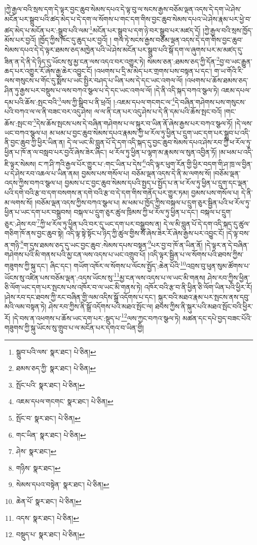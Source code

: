 །ཀྱེ་རྒྱལ་བའི་སྲས་དག་དེ་ལྟར་བྱང་ཆུབ་སེམས་དཔའ་དེ་ལྟ་བུ་ལ་སངས་རྒྱས་བཅོམ་ལྡན་འདས་དེ་དག་ཡེ་ཤེས་མངོན་པར་སྒྲུབ་པའི་ཚད་མེད་པ་དེ་དག་ལ་སོགས་པ་གང་དག་གིས་བྱང་ཆུབ་སེམས་དཔའ་ཡེ་ཤེས་རྣམ་པར་ཕྱེ་བ་ཚད་མེད་པ་མངོན་པར་:སྒྲུབ་པའི་ལམ་\footnote{སྒྲུབ་པའི་ལས་  སྣར་ཐང་།  པེ་ཅིན། }མངོན་པར་སྒྲུབ་པ་དག་ཉེ་བར་སྒྲུབ་པར་མཛད་དོ། །ཀྱེ་རྒྱལ་བའི་སྲས་ཁྱོད་མོས་པར་བྱའོ། །ཁྱོད་ཀྱིས་ཁོང་དུ་ཆུད་པར་བྱའོ། །
གལ་ཏེ་སངས་རྒྱས་བཅོམ་ལྡན་འདས་དེ་དག་གིས་བྱང་ཆུབ་སེམས་དཔའ་དེ་དེ་ལྟར་ཐམས་ཅད་མཁྱེན་པའི་ཡེ་ཤེས་མངོན་པར་སྒྲུབ་པའི་སྒོ་དག་ལ་ཞུགས་པར་མ་མཛད་དུ་ཟིན་ན་དེ་ནི་དེ་ཉིད་དུ་ཡོངས་སུ་མྱ་ངན་ལས་འདའ་བར་འགྱུར་ཏེ། སེམས་ཅན་:ཐམས་ཅད་ཀྱི་དོན་\footnote{ཐམས་ཅད་ཀྱི་  སྣར་ཐང་།  པེ་ཅིན། }བྱ་བ་ཡང་རྒྱུན་ཆད་པར་འགྱུར་རོ་ཞེས་རྒྱ་ཆེར་འབྱུང་ངོ། །འཕགས་པ་དྲི་མ་མེད་པར་གྲགས་པས་བསྟན་པ་དང་། ག་ཡ་གོའི་རི་ལས་གསུངས་པ་གོང་དུ་སྨོས་པ་ཡང་སྤྱིར་བཤད་པ་ཡིན་པས་དེ་དང་ཡང་འགལ་ལོ། །འཕགས་པ་ཆོས་ཐམས་ཅད་ཤིན་ཏུ་རྒྱས་པར་བསྡུས་པ་ལས་བཀའ་སྩལ་པ་དེ་དང་ཡང་འགལ་ལོ། །དེ་ནི་འདི་སྐད་བཀའ་སྩལ་ཏེ། འཇམ་དཔལ་དམ་པའི་ཆོས་:སྤང་བའི་\footnote{སྤོང་པའི་  སྣར་ཐང་།  པེ་ཅིན། }ལས་ཀྱི་སྒྲིབ་པ་ནི་ཕྲའོ། །:འཇམ་དཔལ་གངགང་ལ་\footnote{འཇམ་དཔལ་གངགང་  སྣར་ཐང་།  པེ་ཅིན། }དེ་བཞིན་གཤེགས་པས་གསུངས་པའི་བཀའ་ལ་ལ་ནི་བཟང་བར་འདུ་ཤེས། ལ་ལ་ནི་ངན་པར་འདུ་ཤེས་པ་དེ་ནི་དམ་པའི་ཆོས་སྤང་བའོ། །གང་ཆོས་:སྤང་བ་\footnote{སྤོང་བ་  སྣར་ཐང་།  པེ་ཅིན། }དེས་ཆོས་སྤངས་པས་དེ་བཞིན་གཤེགས་པ་ལ་སྐུར་བ་ཡིན་ནོ་ཞེས་རྒྱས་པར་བཀའ་སྩལ་ཏོ། །དེ་ལས་ཡང་བཀའ་སྩལ་པ། མ་ཕམ་པ་བྱང་ཆུབ་སེམས་དཔའ་རྣམས་ཀྱི་ཕ་རོལ་ཏུ་ཕྱིན་པ་དྲུག་ཡང་དག་པར་སྒྲུབ་པ་འདི་ནི་བྱང་ཆུབ་ཀྱི་ཕྱིར་ཡིན་ན། དེ་ལ་ཡང་མི་བླུན་པོ་དེ་དག་འདི་སྐད་དུ་བྱང་ཆུབ་སེམས་དཔའ་ཤེས་རབ་ཀྱི་ཕ་རོལ་ཏུ་ཕྱིན་པ་ཁོ་ན་ལ་བསླབ་པར་བྱའོ་ཞེས་ཟེར་ཞིང་། ཕ་རོལ་ཏུ་ཕྱིན་པ་ལྷག་མ་རྣམས་ལ་སུན་འབྱིན་ཏོ། །མ་ཕམ་པ་འདི་ཇི་ལྟར་སེམས། ང་ཀ་ཤི་ཀའི་རྒྱལ་པོར་གྱུར་པ་:གང་ཡིན་པ་དེས་\footnote{གང་ཡིན་  སྣར་ཐང་།  པེ་ཅིན། }འདི་ལྟར་ཕུག་རོན་གྱི་ཕྱིར་བདག་གི་ཤ་ཁྲ་ལ་བྱིན་པ་དེ་ཤེས་རབ་འཆལ་པ་ཡིན་ནམ། བྱམས་པས་གསོལ་པ། བཅོམ་ལྡན་འདས་དེ་ནི་མ་ལགས་སོ། །བཅོམ་ལྡན་འདས་ཀྱིས་བཀའ་སྩལ་པ། བྱམས་པ་ང་བྱང་ཆུབ་སེམས་དཔའི་སྤྱད་པ་སྤྱོད་པ་ན་ཕ་རོལ་ཏུ་ཕྱིན་པ་དྲུག་དང་ལྡན་པའི་དགེ་བའི་རྩ་བ་དག་བསགས་ན་དགེ་བའི་རྩ་བ་དེ་དག་གིས་གནོད་པར་གྱུར་ཏམ། བྱམས་པས་གསོལ་པ། དེ་ནི་མ་ལགས་སོ། །བཅོམ་ལྡན་འདས་ཀྱིས་བཀའ་སྩལ་པ། མ་ཕམ་པ་ཁྱོད་ཀྱིས་བསྐལ་པ་དྲུག་ཅུར་སྦྱིན་པའི་ཕ་རོལ་ཏུ་ཕྱིན་པ་ཡང་དག་པར་བསྒྲུབས། བསྐལ་པ་དྲུག་ཅུར་ཚུལ་ཁྲིམས་ཀྱི་ཕ་རོལ་ཏུ་ཕྱིན་པ་དང་། བསྐལ་པ་དྲུག་ཅུར་:ཤེས་རབ་\footnote{ཤེས་  སྣར་ཐང་། }ཀྱི་ཕ་རོལ་ཏུ་ཕྱིན་པའི་བར་དུ་ཡང་དག་པར་བསྒྲུབས་ན། དེ་ལ་མི་བླུན་པོ་དེ་དག་འདི་སྐད་དུ་ཚུལ་གཅིག་ཁོ་ནས་བྱང་ཆུབ་སྟེ། འདི་ལྟ་སྟེ་སྟོང་པ་ཉིད་ཀྱི་ཚུལ་གྱིས་སོ་ཞེས་ཟེར་རོ་ཞེས་རྒྱས་པར་འབྱུང་ངོ། །དེ་ལྟ་བས་ན་གཉི་\footnote{གཉིས་  སྣར་ཐང་། }ག་དུས་ཐམས་ཅད་དུ་ཡང་བྱང་ཆུབ་:སེམས་དཔས་བསྟན་\footnote{སེམས་དཔའ་བསྟེན་  སྣར་ཐང་།  པེ་ཅིན། }པར་བྱ་བ་ཁོ་ན་ཡིན་ནོ། །དེ་ལྟར་ན་དེ་བཞིན་གཤེགས་པའི་མི་གནས་པའི་མྱ་ངན་ལས་འདས་པ་ཡང་འགྲུབ་པོ། །འདི་ལྟར་སྦྱིན་པ་ལ་སོགས་པའི་ཐབས་ཀྱིས་གཟུགས་ཀྱི་སྐུ་དང་། ཞིང་དང་། གཡོག་འཁོར་ལ་སོགས་པ་ལོངས་སྤྱོད་:ཆེན་པོའི་\footnote{ཆེན་པོ་  སྣར་ཐང་།  པེ་ཅིན། }འབྲས་བུ་ཕུན་སུམ་ཚོགས་པ་ཡོངས་སུ་འཛིན་པས་བཅོམ་ལྡན་:འདས་ཡོངས་སུ་\footnote{འདས་  སྣར་ཐང་།  པེ་ཅིན། }མྱ་ངན་ལས་འདས་པ་ལ་ཡང་མི་གནས། ཤེས་རབ་ཀྱིས་ཕྱིན་ཅི་ལོག་ཡང་དག་པར་སྤངས་པས་འཁོར་བ་ལ་ཡང་མི་གནས་ཏེ། འཁོར་བའི་རྩ་བ་ནི་ཕྱིན་ཅི་ལོག་ཡིན་པའི་ཕྱིར་རོ། །ཤེས་རབ་དང་ཐབས་ཀྱི་རང་བཞིན་གྱི་ལམ་འདིས་སྒྲོ་འདོགས་པ་དང་། སྐུར་བའི་མཐའ་རྣམ་པར་སྤངས་ནས་དབུ་མའི་ལམ་བསྟན་ཏེ། ཤེས་རབ་ཀྱིས་ནི་སྒྲོ་འདོགས་པའི་མཐའ་སྤོང་ལ། ཐབས་ཀྱིས་ནི་སྐུར་པའི་མཐའ་སྤོང་བའི་ཕྱིར་རོ། །དེ་བས་ན་འཕགས་པ་ཆོས་ཡང་དག་པར་:སྡུད་པ་\footnote{བསྡུད་པ་  སྣར་ཐང་།  པེ་ཅིན། }ལས་ཀྱང་བཀའ་སྩལ་ཏེ། མཚན་དང་དཔེ་བྱད་བཟང་པོའི་གཟུགས་ཀྱི་སྐུ་ཡོངས་སུ་གྲུབ་པ་ལ་མངོན་པར་དགའ་བ་ཡིན་གྱི། 